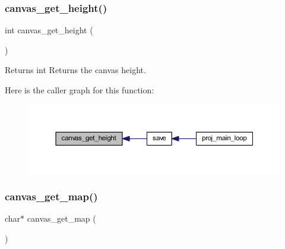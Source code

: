 \subsubsection{\texorpdfstring{canvas\+\_\+get\+\_\+height()}{canvas\_get\_height()}}
{\footnotesize\ttfamily int canvas\+\_\+get\+\_\+height (\begin{DoxyParamCaption}{ }\end{DoxyParamCaption})}

\begin{DoxyReturn}{Returns}
int Returns the canvas height. 
\end{DoxyReturn}
Here is the caller graph for this function\+:\nopagebreak
\begin{figure}[H]
\begin{center}
\leavevmode
\includegraphics[width=350pt]{group__canvas_gac9eac428cd153893841c96d6a9ce982a_icgraph}
\end{center}
\end{figure}
\mbox{\label{group__canvas_gaa7891435582c7691d473ac6532e497a9}} 
\subsubsection{\texorpdfstring{canvas\+\_\+get\+\_\+map()}{canvas\_get\_map()}}
{\footnotesize\ttfamily char$\ast$ canvas\+\_\+get\+\_\+map (\begin{DoxyParamCaption}{ }\end{DoxyParamCaption})}

